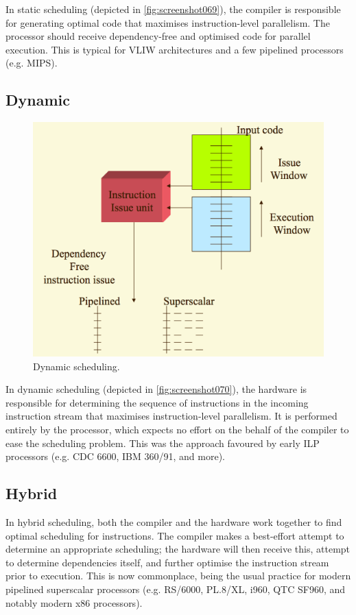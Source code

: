 In static scheduling (depicted in \autoref{fig:screenshot069}), the compiler is responsible for generating optimal code that maximises instruction-level parallelism. The processor should receive dependency-free and optimised code for parallel execution. This is typical for VLIW architectures and a few pipelined processors (e.g. MIPS).

\subsection{Dynamic}
\begin{figure}
\centering
\includegraphics[width=0.7\linewidth]{screenshot070}
\caption{Dynamic scheduling.}
\label{fig:screenshot070}
\end{figure}
In dynamic scheduling (depicted in \autoref{fig:screenshot070}), the hardware is responsible for determining the sequence of instructions in the incoming instruction stream that maximises instruction-level parallelism. It is performed entirely by the processor, which expects no effort on the behalf of the compiler to ease the scheduling problem. This was the approach favoured by early ILP processors (e.g. CDC 6600, IBM 360/91, and more).

\subsection{Hybrid}
In hybrid scheduling, both the compiler and the hardware work together to find optimal scheduling for instructions. The compiler makes a best-effort attempt to determine an appropriate scheduling; the hardware will then receive this, attempt to determine dependencies itself, and further optimise the instruction stream prior to execution. This is now commonplace, being the usual practice for modern pipelined superscalar processors (e.g. RS/6000, PL.8/XL, i960, QTC SF960, and notably modern x86 processors). 

